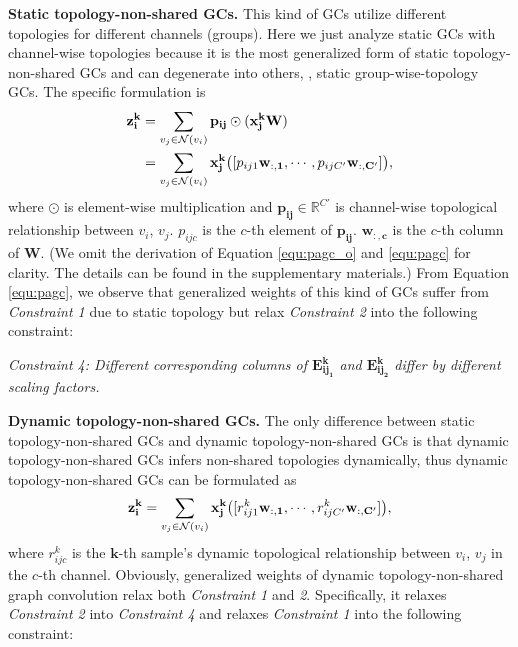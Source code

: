 \documentclass[10pt,twocolumn,letterpaper]{article}
\begin{document}
\noindent \textbf{Static topology-non-shared GCs.} This kind of GCs utilize different topologies for different channels (groups). Here we just analyze static GCs with channel-wise topologies because it is the most generalized form of static topology-non-shared GCs and can degenerate into others, \eg, static group-wise-topology GCs. The specific formulation is
\vspace{-0.15cm}
\begin{align}
\mathbf{z_i^k}&=\sum_{v_j \in \mathcal{N}(v_i)}\mathbf{p_{ij}}\odot(\mathbf{x_j^k}\mathbf{W}) \label{equ:pagc_o}\\
&=\sum_{v_j \in \mathcal{N}(v_i)}\mathbf{x_j^k}\big([p_{ij1}\mathbf{w_{:,1}},\cdots, p_{ijC'}\mathbf{w_{:,C'}}]\big) \label{equ:pagc},
\vspace{-0.5cm}
\end{align}
where $\odot$ is element-wise multiplication and $\mathbf{p_{ij}}\in \mathbb{R}^{C'}$ is channel-wise topological relationship between $v_i$, $v_j$. $p_{ijc}$ is the $c$-th element of $\mathbf{p_{ij}}$. $\mathbf{w_{:,c}}$ is the $c$-th column of $\mathbf{W}$. (We omit the derivation of Equation \ref{equ:pagc_o} and \ref{equ:pagc} for clarity. The details can be found in the supplementary materials.) From Equation \ref{equ:pagc}, we observe that generalized weights of this kind of GCs suffer from \textit{Constraint 1} due to static topology but relax \textit{Constraint 2} into the following constraint:

\noindent \textit{Constraint 4: Different corresponding columns of $\mathbf{E^k_{ij_1}}$ and $\mathbf{E^k_{ij_2}}$ differ by different scaling factors.}

\noindent \textbf{Dynamic topology-non-shared GCs.} The only difference between static topology-non-shared GCs and dynamic topology-non-shared GCs is that dynamic topology-non-shared GCs infers non-shared topologies dynamically, thus dynamic topology-non-shared GCs can be formulated as
\vspace{-0.15cm}
\begin{equation}
\vspace{-0.15cm}
\mathbf{z_i^k}=\sum_{v_j \in \mathcal{N}(v_i)}\mathbf{x_j^k}\big([r_{ij1}^k\mathbf{w_{:,1}},\cdots, r_{ijC'}^k\mathbf{w_{:,C'}}]\big), \label{equ:dynamic_non_shared}
\end{equation}
where $r_{ijc}^k$ is the $\mathbf{k}$-th sample's dynamic topological relationship between $v_i$, $v_j$ in the $c$-th channel. Obviously, generalized weights of dynamic topology-non-shared graph convolution relax both \textit{Constraint 1} and \textit{2}. Specifically, it relaxes \textit{Constraint 2} into \textit{Constraint 4} and relaxes \textit{Constraint 1} into the following constraint:
\end{document}
